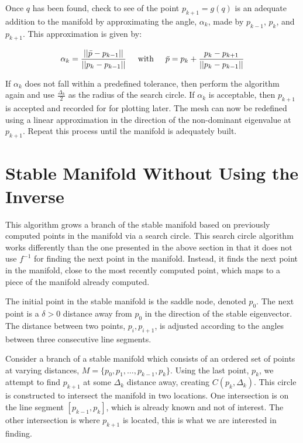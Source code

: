 \documentclass[12pt]{article}
\begin{document}
	Once $q$ has been found, check to see of the point $p_{k+1}=g(q)$ is an adequate addition to the manifold by approximating the angle, $\alpha_k$, made by $p_{k-1}$, $p_k$, and $p_{k+1}$. This approximation is given by:
	
	\begin{equation}\label{alpha1}
	\alpha_k=\dfrac{||\bar{p}-p_{k-1}||}{||p_k-p_{k-1}||}\hspace{5mm} \textrm{with} \hspace{5mm} \bar{p}=p_k+\dfrac{p_k-p_{k+1}}{||p_k-p_{k-1}||}
	\end{equation}
	
	If $\alpha_k$ does not fall within a predefined tolerance, then perform the algorithm again and use $\frac{\Delta_k}{2}$ as the radius of the search circle. If $\alpha_k$ is acceptable, then $p_{k+1}$ is accepted and recorded for for plotting later. The mesh can now be redefined using a linear approximation in the direction of the non-dominant eigenvalue at $p_{k+1}$. Repeat this process until the manifold is adequately built.

\section{Stable Manifold Without Using the Inverse}

	This algorithm grows a branch of the stable manifold based on previously computed points in the manifold via a search circle. This search circle algorithm works differently than the one presented in the above section in that it does not use $f^{-1}$ for finding the next point in the manifold. Instead, it finds the next point in the manifold, close to the most recently computed point, which maps to a piece of the manifold already computed.
	
	The initial point in the stable manifold is the saddle node, denoted $p_0$. The next point is a $\delta>0$ distance away from $p_0$ in the direction of the stable eigenvector. The distance between two points, $p_i, p_{i+1}$, is adjusted according to the angles between three consecutive line segments.
	
	Consider a branch of a stable manifold which consists of an ordered set of points at varying distances, $M = \{p_0, p_1, \dots, p_{k-1}, p_k\}$. Using the last point, $p_k$, we attempt to find $p_{k+1}$ at some $\Delta_k$ distance away, creating $C(p_k, \Delta_k)$. This circle is constructed to intersect the manifold in two locations. One intersection is on the line segment $[p_{k-1},p_k]$, which is already known and not of interest. The other intersection is where $p_{k+1}$ is located, this is what we are interested in finding.
	
\end{document}
